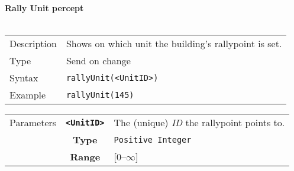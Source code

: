 \noindent
\textbf{Rally Unit percept}\\
\\
\begin{tabularx}{\textwidth}{lX}
 Description & Shows on which unit the building's rallypoint is set. \\
 Type & Send on change \\
 Syntax & \verb|rallyUnit(<UnitID>)| \\
 Example & \verb|rallyUnit(145)| \\
 \end{tabularx}
 \begin{tabularx}{\textwidth}{l | c | p{8cm}|}
 \cline{2-3}
 Parameters & \textbf{\verb|<UnitID>|} & The (unique) \textit{ID} the rallypoint points to. \\
            & \textbf{Type} & \verb|Positive Integer| \\
            & \textbf{Range} & [0--$\infty$] \\
            \cline{2-3}
\end{tabularx}\\
\newpage
